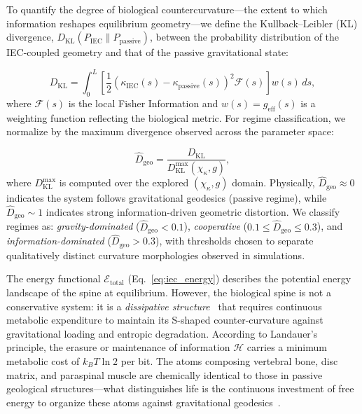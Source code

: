 \documentclass[11pt,a4paper]{article}
\newcommand{\Dgeohat}{\widehat{D}_{\mathrm{geo}}}
\newcommand{\ShannonH}{\mathcal{H}}
\newcommand{\KLDivergence}{D_{\mathrm{KL}}}
\newcommand{\FisherInfo}{\mathcal{F}}
\begin{document}
To quantify the degree of biological countercurvature—the extent to which information reshapes equilibrium geometry—we define the Kullback--Leibler (KL) divergence, $\KLDivergence(P_{\mathrm{IEC}} \| P_{\mathrm{passive}})$, between the probability distribution of the IEC-coupled geometry and that of the passive gravitational state:

\begin{equation}
\KLDivergence = \int_0^L \left[ \frac{1}{2} \left( \kappa_{\mathrm{IEC}}(s) - \kappa_{\mathrm{passive}}(s) \right)^2 \FisherInfo(s) \right] w(s)\, ds,
\label{eq:kl_divergence}
\end{equation}
where $\FisherInfo(s)$ is the local Fisher Information and $w(s) = g_{\mathrm{eff}}(s)$ is a weighting function reflecting the biological metric. For regime classification, we normalize by the maximum divergence observed across the parameter space:

\begin{equation}
\Dgeohat = \frac{\KLDivergence}{\KLDivergence^{\mathrm{max}}(\chi_\kappa, g)},
\label{eq:dgeo_normalized}
\end{equation}
where $\KLDivergence^{\mathrm{max}}$ is computed over the explored $(\chi_\kappa, g)$ domain. Physically, $\Dgeohat \approx 0$ indicates the system follows gravitational geodesics (passive regime), while $\Dgeohat \sim 1$ indicates strong information-driven geometric distortion. We classify regimes as: \emph{gravity-dominated} ($\Dgeohat < 0.1$), \emph{cooperative} ($0.1 \leq \Dgeohat \leq 0.3$), and \emph{information-dominated} ($\Dgeohat > 0.3$), with thresholds chosen to separate qualitatively distinct curvature morphologies observed in simulations.

The energy functional $\mathcal{E}_{\mathrm{total}}$ (Eq.~\ref{eq:iec_energy}) describes the potential energy landscape of the spine at equilibrium. However, the biological spine is not a conservative system: it is a \emph{dissipative structure}~\cite{prigogine1977self} that requires continuous metabolic expenditure to maintain its S-shaped counter-curvature against gravitational loading and entropic degradation. According to Landauer's principle, the erasure or maintenance of information $\ShannonH$ carries a minimum metabolic cost of $k_B T \ln 2$ per bit. The atoms composing vertebral bone, disc matrix, and paraspinal muscle are chemically identical to those in passive geological structures---what distinguishes life is the continuous investment of free energy to organize these atoms against gravitational geodesics~\cite{friston2013life}.
\end{document}
